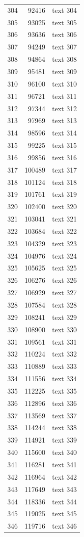 \documentclass[10pt]{article}
\begin{document}
\begin{longtable}{rrl}
304&92416&text 304\\
305&93025&text 305\\
306&93636&text 306\\
307&94249&text 307\\
308&94864&text 308\\
309&95481&text 309\\
310&96100&text 310\\
311&96721&text 311\\
312&97344&text 312\\
313&97969&text 313\\
314&98596&text 314\\
315&99225&text 315\\
316&99856&text 316\\
317&100489&text 317\\
318&101124&text 318\\
319&101761&text 319\\
320&102400&text 320\\
321&103041&text 321\\
322&103684&text 322\\
323&104329&text 323\\
324&104976&text 324\\
325&105625&text 325\\
326&106276&text 326\\
327&106929&text 327\\
328&107584&text 328\\
329&108241&text 329\\
330&108900&text 330\\
331&109561&text 331\\
332&110224&text 332\\
333&110889&text 333\\
334&111556&text 334\\
335&112225&text 335\\
336&112896&text 336\\
337&113569&text 337\\
338&114244&text 338\\
339&114921&text 339\\
340&115600&text 340\\
341&116281&text 341\\
342&116964&text 342\\
343&117649&text 343\\
344&118336&text 344\\
345&119025&text 345\\
346&119716&text 346\\

\end{longtable}
\end{document}
